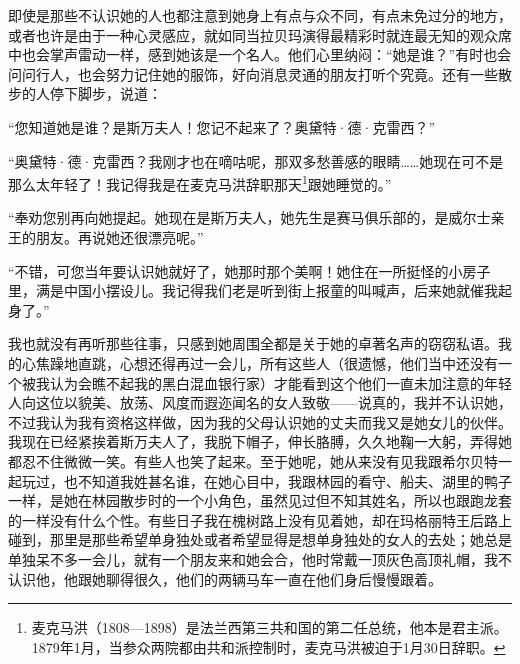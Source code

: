 \par 即使是那些不认识她的人也都注意到她身上有点与众不同，有点未免过分的地方，或者也许是由于一种心灵感应，就如同当拉贝玛演得最精彩时就连最无知的观众席中也会掌声雷动一样，感到她该是一个名人。他们心里纳闷：“她是谁？”有时也会问问行人，也会努力记住她的服饰，好向消息灵通的朋友打听个究竟。还有一些散步的人停下脚步，说道：
\par “您知道她是谁？是斯万夫人！您记不起来了？奥黛特·德·克雷西？”
\par “奥黛特·德·克雷西？我刚才也在嘀咕呢，那双多愁善感的眼睛……她现在可不是那么太年轻了！我记得我是在麦克马洪辞职那天\footnote{麦克马洪（1808—1898）是法兰西第三共和国的第二任总统，他本是君主派。1879年1月，当参众两院都由共和派控制时，麦克马洪被迫于1月30日辞职。}跟她睡觉的。”
\par “奉劝您别再向她提起。她现在是斯万夫人，她先生是赛马俱乐部的，是威尔士亲王的朋友。再说她还很漂亮呢。”
\par “不错，可您当年要认识她就好了，她那时那个美啊！她住在一所挺怪的小房子里，满是中国小摆设儿。我记得我们老是听到街上报童的叫喊声，后来她就催我起身了。”
\par 我也就没有再听那些往事，只感到她周围全都是关于她的卓著名声的窃窃私语。我的心焦躁地直跳，心想还得再过一会儿，所有这些人（很遗憾，他们当中还没有一个被我认为会瞧不起我的黑白混血银行家）才能看到这个他们一直未加注意的年轻人向这位以貌美、放荡、风度而遐迩闻名的女人致敬——说真的，我并不认识她，不过我认为我有资格这样做，因为我的父母认识她的丈夫而我又是她女儿的伙伴。我现在已经紧挨着斯万夫人了，我脱下帽子，伸长胳膊，久久地鞠一大躬，弄得她都忍不住微微一笑。有些人也笑了起来。至于她呢，她从来没有见我跟希尔贝特一起玩过，也不知道我姓甚名谁，在她心目中，我跟林园的看守、船夫、湖里的鸭子一样，是她在林园散步时的一个小角色，虽然见过但不知其姓名，所以也跟跑龙套的一样没有什么个性。有些日子我在槐树路上没有见着她，却在玛格丽特王后路上碰到，那里是那些希望单身独处或者希望显得是想单身独处的女人的去处；她总是单独呆不多一会儿，就有一个朋友来和她会合，他时常戴一顶灰色高顶礼帽，我不认识他，他跟她聊得很久，他们的两辆马车一直在他们身后慢慢跟着。

